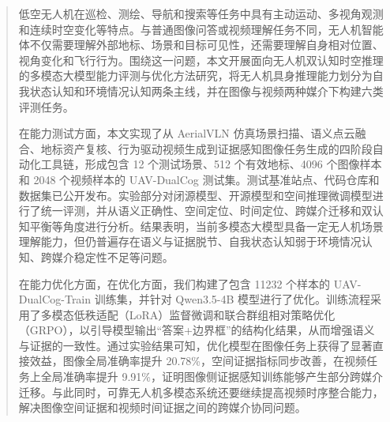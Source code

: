 
\begin{abstract}
    低空无人机在巡检、测绘、导航和搜索等任务中具有主动运动、多视角观测和连续时空变化等特点。与普通图像问答或视频理解任务不同，无人机智能体不仅需要理解外部地标、场景和目标可见性，还需要理解自身相对位置、视角变化和飞行行为。围绕这一问题，本文开展面向无人机双认知时空推理的多模态大模型能力评测与优化方法研究，将无人机具身推理能力划分为自我状态认知和环境情况认知两条主线，并在图像与视频两种媒介下构建六类评测任务。

    在能力测试方面，本文实现了从 AerialVLN 仿真场景扫描、语义点云融合、地标资产复核、行为驱动视频生成到证据感知图像任务生成的四阶段自动化工具链，形成包含 12 个测试场景、512 个有效地标、4096 个图像样本和 2048 个视频样本的 UAV-DualCog 测试集。测试基准站点、代码仓库和数据集已公开发布。实验部分对闭源模型、开源模型和空间推理微调模型进行了统一评测，并从语义正确性、空间定位、时间定位、跨媒介迁移和双认知平衡等角度进行分析。结果表明，当前多模态大模型具备一定无人机场景理解能力，但仍普遍存在语义与证据脱节、自我状态认知弱于环境情况认知、跨媒介稳定性不足等问题。

    在能力优化方面，在优化方面，我们构建了包含 11232 个样本的 UAV-DualCog-Train 训练集，并针对 Qwen3.5-4B 模型进行了优化。训练流程采用了多模态低秩适配（LoRA）监督微调和联合群组相对策略优化（GRPO），以引导模型输出“答案+边界框”的结构化结果，从而增强语义与证据的一致性。通过实验结果可知，优化模型在图像任务上获得了显著直接效益，图像全局准确率提升 20.78\%，空间证据指标同步改善，在视频任务上全局准确率提升 9.91\%，证明图像侧证据感知训练能够产生部分跨媒介迁移。与此同时，可靠无人机多模态系统还要继续提高视频时序整合能力，解决图像空间证据和视频时间证据之间的跨媒介协同问题。
\end{abstract}

